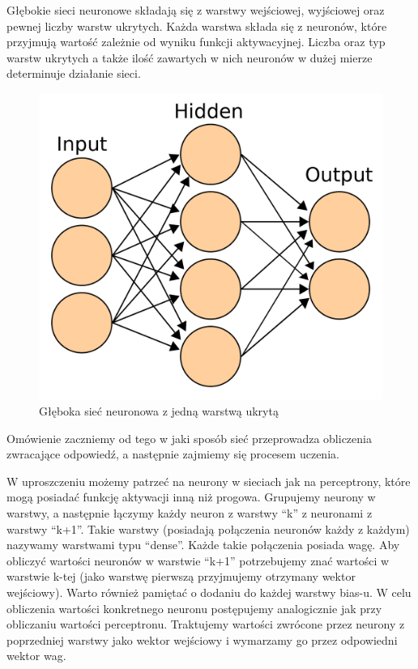 \documentclass{article}
\begin{document}
Głębokie sieci neuronowe składają się z warstwy wejściowej, wyjściowej oraz pewnej liczby warstw ukrytych.
Każda warstwa składa się z neuronów, które przyjmują wartość zależnie od wyniku funkcji aktywacyjnej.
Liczba oraz typ warstw ukrytych a także ilość zawartych w nich neuronów w dużej mierze determinuje działanie sieci.
\begin{figure}[H]
    \centering
    \includegraphics[width=\linewidth]{"images/dnn.png"}
    \caption{Głęboka sieć neuronowa z jedną warstwą ukrytą}
\end{figure}
Omówienie zaczniemy od tego w jaki sposób sieć przeprowadza obliczenia zwracające odpowiedź, a następnie zajmiemy się procesem uczenia.

W uproszczeniu możemy patrzeć na neurony w sieciach jak na perceptrony, które mogą posiadać funkcję aktywacji inną niż progowa.
Grupujemy neurony w warstwy, a następnie łączymy każdy neuron z warstwy ``k'' z neuronami z warstwy ``k+1''. Takie warstwy (posiadają połączenia neuronów każdy z każdym) nazywamy warstwami typu ``dense''.
Każde takie połączenia posiada wagę.
Aby obliczyć wartości neuronów w warstwie ``k+1'' potrzebujemy znać wartości w warstwie k-tej (jako warstwę pierwszą przyjmujemy otrzymany wektor wejściowy).
Warto również pamiętać o dodaniu do każdej warstwy bias-u.
W celu obliczenia wartości konkretnego neuronu postępujemy analogicznie jak przy obliczaniu wartości perceptronu.
Traktujemy wartości zwrócone przez neurony z poprzedniej warstwy jako wektor wejściowy i wymarzamy go przez odpowiedni wektor wag.
\end{document}
